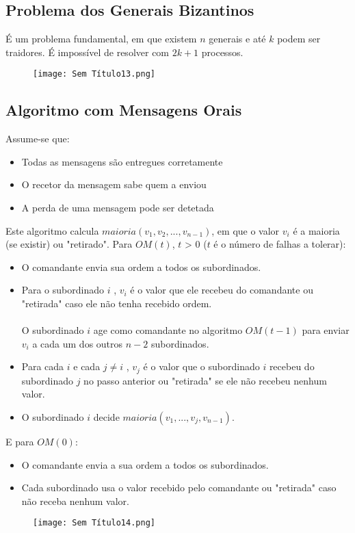 \documentclass[10pt,a4paper]{report}
\begin{document}
\subsection{Problema dos Generais Bizantinos}
É um problema fundamental, em que existem $n$ generais e até $k$ podem ser traidores. É impossível de resolver com $2k + 1$ processos.
\begin{figure}[H]
\centering
\texttt{[image: Sem Título13.png]}
\end{figure}
\subsection{Algoritmo com Mensagens Orais}
Assume-se que:
\begin{itemize}
\item Todas as mensagens são entregues corretamente
\item O recetor da mensagem sabe quem a enviou
\item A perda de uma mensagem pode ser detetada
\end{itemize}
Este algoritmo calcula $maioria(v_1,v_2,...,v_{n-1})$, em que o valor $v_i$ é a maioria (se existir) ou "retirado". Para $OM(t)$, $t$ > 0 ($t$ é o número de falhas a tolerar):
\begin{itemize}
\item O comandante envia sua ordem a todos os subordinados.
\item Para o subordinado $i$ , $v_i$ é o valor que ele recebeu do comandante ou "retirada" caso ele não tenha recebido ordem.\\
\\
O subordinado $i$ age como comandante no algoritmo $OM(t-1)$ para enviar $v_i$ a cada um dos outros $n-2$ subordinados.
\item Para cada $i$ e cada $j \neq i$ , $v_j$ é o valor que o subordinado $i$ recebeu do subordinado $j$ no passo anterior ou "retirada" se ele não recebeu nenhum valor.
\item O subordinado $i$ decide $maioria(v_1,...,v_j,v_{n-1})$.
\end{itemize}
E para $OM(0)$:
\begin{itemize}
\item O comandante envia a sua ordem a todos os subordinados.
\item Cada subordinado usa o valor recebido pelo comandante ou "retirada" caso não receba nenhum valor.
\end{itemize}
\begin{figure}[H]
\centering
\texttt{[image: Sem Título14.png]}
\end{figure}
\end{document}
